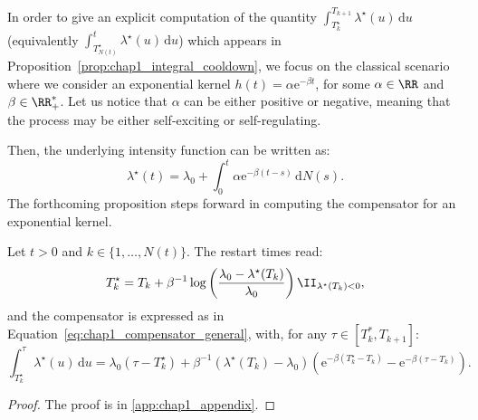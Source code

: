 In order to give an explicit computation of the quantity $\int_{T_{k}^\star}^{T_{k+1}}{\lambda^\star(u)\,\mathrm{d}u}$ (equivalently $\int_{T_{N(t)}^\star}^{t}{\lambda^\star(u)\,\mathrm{d}u}$) which appears in Proposition~\ref{prop:chap1_integral_cooldown}, we focus on the classical scenario where we consider an exponential kernel $h(t) = \alpha \mathrm{e}^{-\beta t}$, for some $\alpha\in\RR$ and $\beta\in\RR_+^*$.
Let us notice that $\alpha$ can be either positive or negative, meaning that the process may be either self-exciting or self-regulating.

Then, the underlying intensity function can be written as:
\begin{equation}\label{eq:chap1_exponential_intensity}
    \lambda^\star(t) = \lambda_0 + \int_{0}^{t}{\alpha \mathrm{e}^{-\beta(t-s)}\,\mathrm{d}N(s)}.
\end{equation}
The forthcoming proposition steps forward in computing the compensator for an exponential kernel.

\begin{proposition}
Let $t > 0$ and $k \in \{1, \dots, N(t)\}$.
The restart times read:
\[
    T_k^\star = T_k + \beta^{-1} \log \left({\frac{\lambda_0 - \lambda^\star(T_k)}{\lambda_0}} \right) \II_{\lambda^\star(T_k) < 0},
\]
and the compensator is expressed as in Equation~\eqref{eq:chap1_compensator_general}, with,
for any $\tau \in [T_{k}^*, T_{k+1}]$:
\[
    \int_{T_{k}^\star}^{\tau}{\lambda^\star(u)\,\mathrm{d}u}
    = \lambda_0(\tau - T_{k}^\star) + \beta^{-1} (\lambda^\star(T_{k}) - \lambda_0) (\mathrm{e}^{-\beta(T_{k}^\star-T_{k})}-\mathrm{e}^{-\beta(\tau-T_{k})}).
\]

\label{prop:chap1_exp}
\end{proposition}
\begin{proof}
The proof is in \ref{app:chap1_appendix}.
\end{proof}


